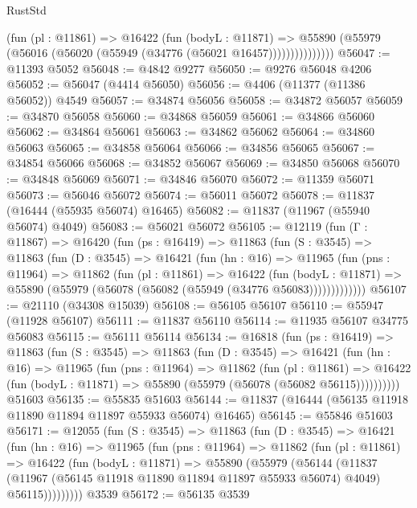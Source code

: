 \begin{lexlean}{RustStd}
\begin{coremodule}
{\begin{coremodule}
{{{{{{{{{{{{{{{{{{{{{{{{{{{{{{{{{{{{{{{{{{{{{{{{{{                  (fun (pl : @11861) =>
                  @16422
                    (fun (bodyL : @11871) =>
                    @55890 (@55979 (@56016 (@56020 (@55949 (@34776 (@56021 @16457)))))))))))))))
@56047 := @11393 @5052
@56048 := @4842 @9277
@56050 := @9276 @56048 @4206
@56052 := @56047 (@4414 @56050)
@56056 := @4406 (@11377 (@11386 @56052)) @4549
@56057 := @34874 @56056
@56058 := @34872 @56057
@56059 := @34870 @56058
@56060 := @34868 @56059
@56061 := @34866 @56060
@56062 := @34864 @56061
@56063 := @34862 @56062
@56064 := @34860 @56063
@56065 := @34858 @56064
@56066 := @34856 @56065
@56067 := @34854 @56066
@56068 := @34852 @56067
@56069 := @34850 @56068
@56070 := @34848 @56069
@56071 := @34846 @56070
@56072 := @11359 @56071
@56073 := @56046 @56072
@56074 := @56011 @56072
@56078 := @11837 (@16444 (@55935 @56074) @16465)
@56082 := @11837 (@11967 (@55940 @56074) @4049)
@56083 := @56021 @56072
@56105 := @12119
    (fun (Γ : @11867) =>
    @16420
      (fun (ps : @16419) =>
      @11863
        (fun (S : @3545) =>
        @11863
          (fun (D : @3545) =>
          @16421
            (fun (hn : @16) =>
            @11965
              (fun (pns : @11964) =>
              @11862
                (fun (pl : @11861) =>
                @16422
                  (fun (bodyL : @11871) =>
                  @55890 (@55979 (@56078 (@56082 (@55949 (@34776 @56083)))))))))))))
@56107 := @21110 (@34308 @15039)
@56108 := @56105 @56107
@56110 := @55947 (@11928 @56107)
@56111 := @11837 @56110
@56114 := @11935 @56107 @34775 @56083
@56115 := @56111 @56114
@56134 := @16818
    (fun (ps : @16419) =>
    @11863
      (fun (S : @3545) =>
      @11863
        (fun (D : @3545) =>
        @16421
          (fun (hn : @16) =>
          @11965
            (fun (pns : @11964) =>
            @11862
              (fun (pl : @11861) =>
              @16422 (fun (bodyL : @11871) => @55890 (@55979 (@56078 (@56082 @56115))))))))))
    @51603
@56135 := @55835 @51603
@56144 := @11837 (@16444 (@56135 @11918 @11890 @11894 @11897 @55933 @56074) @16465)
@56145 := @55846 @51603
@56171 := @12055
    (fun (S : @3545) =>
    @11863
      (fun (D : @3545) =>
      @16421
        (fun (hn : @16) =>
        @11965
          (fun (pns : @11964) =>
          @11862
            (fun (pl : @11861) =>
            @16422
              (fun (bodyL : @11871) =>
              @55890
                (@55979
                  (@56144
                    (@11837
                      (@11967 (@56145 @11918 @11890 @11894 @11897 @55933 @56074) @4049)
                      @56115)))))))))
    @3539
@56172 := @56135 @3539
}}}}}}}}}}}}}}}}}}}}}}}}}}}}}}}}}}}}}}}}}}}}}}}}}}
\end{coremodule}}
\end{coremodule}
\end{lexlean}
